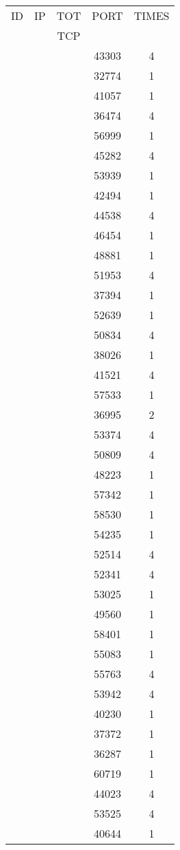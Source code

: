 \documentclass[a4paper]{scrartcl}
\begin{document}
\begin{minipage}[b]{0.5\linewidth}
\begin{tabular}{| c | c | c | c | c |}
\hline
ID & IP & TOT & PORT & TIMES \\ 
   &    & TCP &      &       \\ 
\hline
& & & 43303 & 4 \\ & & & 32774 & 1 \\ & & & 41057 & 1 \\ & & & 36474 & 4 \\ & & & 56999 & 1 \\ & & & 45282 & 4 \\ & & & 53939 & 1 \\ & & & 42494 & 1 \\ & & & 44538 & 4 \\ & & & 46454 & 1 \\ & & & 48881 & 1 \\ & & & 51953 & 4 \\ & & & 37394 & 1 \\ & & & 52639 & 1 \\ & & & 50834 & 4 \\ & & & 38026 & 1 \\ & & & 41521 & 4 \\ & & & 57533 & 1 \\ & & & 36995 & 2 \\ & & & 53374 & 4 \\ & & & 50809 & 4 \\ & & & 48223 & 1 \\ & & & 57342 & 1 \\ & & & 58530 & 1 \\ & & & 54235 & 1 \\ & & & 52514 & 4 \\ & & & 52341 & 4 \\ & & & 53025 & 1 \\ & & & 49560 & 1 \\ & & & 58401 & 1 \\ & & & 55083 & 1 \\ & & & 55763 & 4 \\ & & & 53942 & 4 \\ & & & 40230 & 1 \\ & & & 37372 & 1 \\ & & & 36287 & 1 \\ & & & 60719 & 1 \\ & & & 44023 & 4 \\ & & & 53525 & 4 \\ & & & 40644 & 1 \\ \hline\end{tabular}\end{minipage} \hfill\begin{minipage}[b]{0.5\linewidth}\begin{tabular}{| c | c | c | c | c |}

\end{tabular}
\end{minipage}
\end{document}
